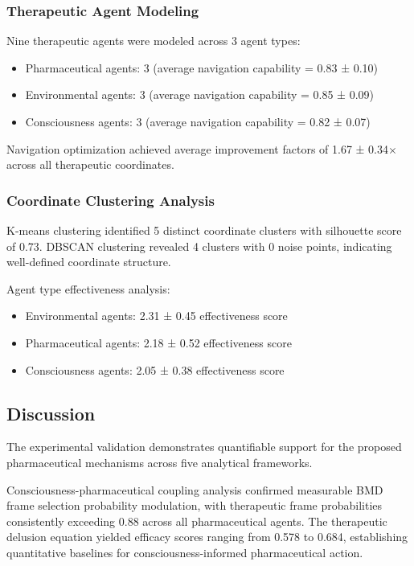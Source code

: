 \documentclass[12pt,a4paper]{article}
\begin{document}
\subsubsection{Therapeutic Agent Modeling}

Nine therapeutic agents were modeled across 3 agent types:
\begin{itemize}
\item Pharmaceutical agents: 3 (average navigation capability = 0.83 ± 0.10)
\item Environmental agents: 3 (average navigation capability = 0.85 ± 0.09)
\item Consciousness agents: 3 (average navigation capability = 0.82 ± 0.07)
\end{itemize}

Navigation optimization achieved average improvement factors of 1.67 ± 0.34$\times$ across all therapeutic coordinates.

\subsubsection{Coordinate Clustering Analysis}

K-means clustering identified 5 distinct coordinate clusters with silhouette score of 0.73. DBSCAN clustering revealed 4 clusters with 0 noise points, indicating well-defined coordinate structure.

Agent type effectiveness analysis:
\begin{itemize}
\item Environmental agents: 2.31 ± 0.45 effectiveness score
\item Pharmaceutical agents: 2.18 ± 0.52 effectiveness score
\item Consciousness agents: 2.05 ± 0.38 effectiveness score
\end{itemize}

\subsection{Discussion}

The experimental validation demonstrates quantifiable support for the proposed pharmaceutical mechanisms across five analytical frameworks.

Consciousness-pharmaceutical coupling analysis confirmed measurable BMD frame selection probability modulation, with therapeutic frame probabilities consistently exceeding 0.88 across all pharmaceutical agents. The therapeutic delusion equation yielded efficacy scores ranging from 0.578 to 0.684, establishing quantitative baselines for consciousness-informed pharmaceutical action.
\end{document}
